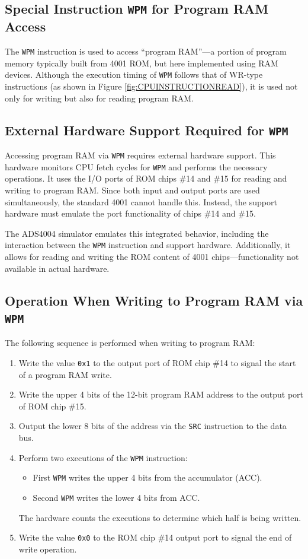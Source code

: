 \subsection{Special Instruction \texttt{WPM} for Program RAM Access}
The \texttt{WPM} instruction is used to access ``program RAM''—a portion of program memory typically built from 4001 ROM, but here implemented using RAM devices.  
Although the execution timing of \texttt{WPM} follows that of WR-type instructions (as shown in Figure \ref{fig:CPUINSTRUCTIONREAD}), it is used not only for writing but also for reading program RAM.

\subsection{External Hardware Support Required for \texttt{WPM}}
Accessing program RAM via \texttt{WPM} requires external hardware support.  
This hardware monitors CPU fetch cycles for \texttt{WPM} and performs the necessary operations.  
It uses the I/O ports of ROM chips \#14 and \#15 for reading and writing to program RAM.  
Since both input and output ports are used simultaneously, the standard 4001 cannot handle this.  
Instead, the support hardware must emulate the port functionality of chips \#14 and \#15.

The ADS4004 simulator emulates this integrated behavior, including the interaction between the \texttt{WPM} instruction and support hardware.  
Additionally, it allows for reading and writing the ROM content of 4001 chips—functionality not available in actual hardware.

\subsection{Operation When Writing to Program RAM via \texttt{WPM}}
The following sequence is performed when writing to program RAM:

\begin{enumerate}
  \item Write the value \texttt{0x1} to the output port of ROM chip \#14 to signal the start of a program RAM write.
  \item Write the upper 4 bits of the 12-bit program RAM address to the output port of ROM chip \#15.
  \item Output the lower 8 bits of the address via the \texttt{SRC} instruction to the data bus.
  \item Perform two executions of the \texttt{WPM} instruction:
    \begin{itemize}
      \item First \texttt{WPM} writes the upper 4 bits from the accumulator (ACC).
      \item Second \texttt{WPM} writes the lower 4 bits from ACC.
    \end{itemize}
    The hardware counts the executions to determine which half is being written.
  \item Write the value \texttt{0x0} to the ROM chip \#14 output port to signal the end of write operation.
\end{enumerate}

